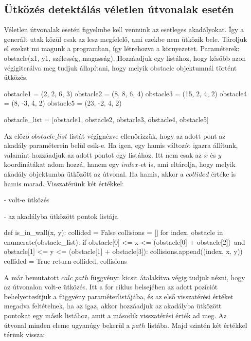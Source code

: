 \newpage
\subsection{Ütközés detektálás véletlen útvonalak esetén}
Véletlen útvonalak esetén figyelmbe kell vennünk az esetleges akadályokat. Így a generált utak közül csak az lesz megfelelő, ami ezekbe nem ütközik bele. Tároljuk el ezeket mi magunk a programban, így létrehozva a környezetet. Paraméterek: obstacle(x1, y1, szélesség, magasság). Hozzáadjuk egy listához, hogy később azon végigiterálva meg tudjuk állapítani, hogy melyik obstacle objektumnál történt ütközés.

\begin{python}
obstacle1 = (2, 2, 6, 3)
obstacle2 = (8, 8, 6, 4)
obstacle3 = (15, 2, 4, 2)
obstacle4 = (8, -3, 4, 2)
obstacle5 = (23, -2, 4, 2)

obstacle_list = [obstacle1, obstacle2, obstacle3, obstacle4, obstacle5]
\end{python}

Az előző $ obstacle\_list $ listát végignézve ellenőrizzük, hogy az adott pont az akadály paraméterein belül esik-e. Ha igen, egy hamis változót igazra állítunk, valamint hozzáadjuk az adott pontot egy listához. Itt nem csak az $ x $ és $ y $ koordinátákat adom hozzá, hanem egy $ index $-et is, ami eltárolja, hogy melyik akadály objektumba ütközött az útvonal. Ha hamis, akkor a $ collided $ értéke is hamis marad. Visszatérünk két értékkel:

- volt-e ütközés

- az akadályba ütközött pontok listája

\begin{python}
def is_in_wall(x, y):
    collided = False
    collisions = []
    for index, obstacle in enumerate(obstacle_list):
        if obstacle[0] <= x <= (obstacle[0] + obstacle[2])\
                and obstacle[1] <= y <= (obstacle[1] + obstacle[3]):
            collisions.append((index, x, y))
            collided = True
    return collided, collisions
\end{python}

A már bemutatott $calc\_path$ függvényt kicsit átalakítva végig tudjuk nézni, hogy az útvonalon volt-e ütközés. Itt a for ciklus belsejében az adott pozíciót behelyettesítjük a függvény paraméterlistájába, és az első visszatérési értéket megadva feltételnek, ha az igaz, akkor hozzáadjuk az akadályba ütközött pontokat egy másik listához, amit a második visszatérési érték ad meg. Az útvonal minden eleme ugyanúgy bekerül a $ path $ listába. Majd szintén két értékkel térünk vissza:

